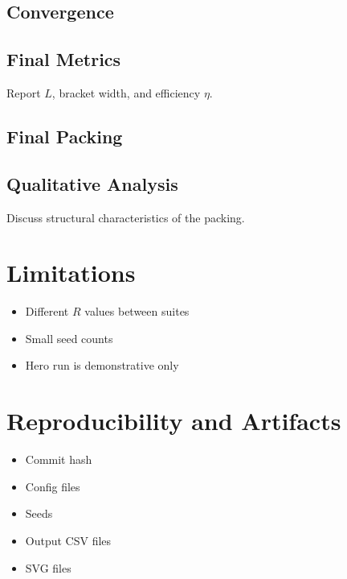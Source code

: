\documentclass[11pt]{report}
\newcommand{\figdir}{figures}
\begin{document}
\section{Convergence}


\section{Final Metrics}

Report $L$, bracket width, and efficiency $\eta$.

\section{Final Packing}


\section{Qualitative Analysis}

Discuss structural characteristics of the packing.

\chapter{Limitations}

\begin{itemize}
    \item Different $R$ values between suites
    \item Small seed counts
    \item Hero run is demonstrative only
\end{itemize}

\chapter{Reproducibility and Artifacts}

\begin{itemize}
    \item Commit hash
    \item Config files
    \item Seeds
    \item Output CSV files
    \item SVG files
\end{itemize}
\end{document}
